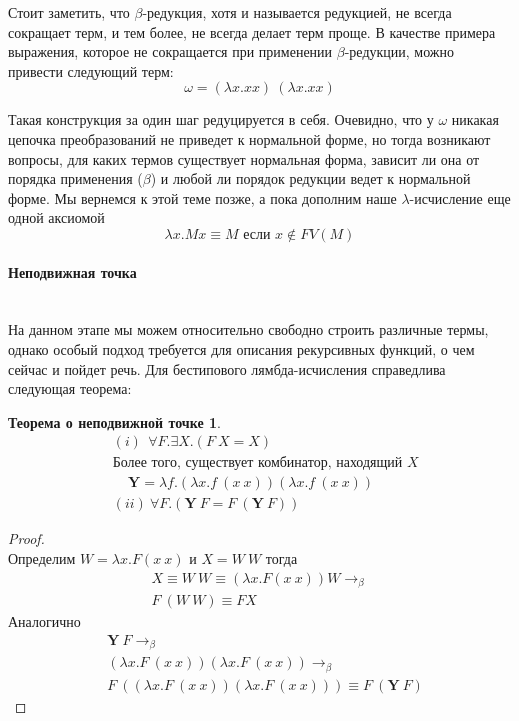 \documentclass[lambda.tex]{subfiles}
\begin{document}
Стоит заметить, что $\beta$-редукция, хотя и называется редукцией, не всегда сокращает терм, и тем более, не всегда делает терм проще. В качестве примера выражения, которое не сокращается при применении $\beta$-редукции, можно привести следующий терм:
\begin{equation*}
	\omega = (\lambda x.xx)\ (\lambda x.xx)
\end{equation*}

Такая конструкция за один шаг редуцируется в себя. Очевидно, что у $\omega$ никакая цепочка преобразований не приведет к нормальной форме, но тогда возникают вопросы, для каких термов существует нормальная форма, зависит ли она от порядка применения ($\beta$) и любой ли порядок редукции ведет к нормальной форме. Мы вернемся к этой теме позже, а пока дополним наше $\lambda$-исчисление еще одной аксиомой
\begin{equation*}
	\lambda x.Mx \equiv M \text{ если }x \not\in FV(M) \tag{$\eta$}
\end{equation*}

\newpage
\paragraph{Неподвижная точка} %
\label{par:fix point}~\\

На данном этапе мы можем относительно свободно строить различные термы, однако особый подход требуется для описания рекурсивных функций, о чем сейчас и пойдет речь. Для бестипового лямбда-исчисления справедлива следующая теорема:
\newtheorem*{fixpoint}{Теорема о неподвижной точке}
\begin{fixpoint}
\begin{align*}
	&(i)\ \ \forall F. \exists X. (F\ X = X) \\
	&\text{Более того, существует комбинатор, находящий $X$}\\
	&\ \ \ \ \ \boldsymbol{Y} = \lambda f.(\lambda x.f\ (x\ x)) (\lambda x.f\ (x\ x))\\
	&(ii)\ \forall F.(\boldsymbol{Y}\ F=F\ (\boldsymbol{Y}\ F))
\end{align*}
\end{fixpoint}

\begin{proof}~\\
Определим $W = \lambda x.F(x\ x)$ и $X = W\ W$ тогда
\begin{align*}
	X \equiv W\ W \equiv (\lambda x.F(x\ x))W \rightarrow_\beta\\
	F\ (W\ W) \equiv F X
\end{align*}
Аналогично
\begin{align*}
	&\boldsymbol{Y}\ F \rightarrow_\beta\\
	&(\lambda x.F\ (x\ x)) (\lambda x.F\ (x\ x)) \rightarrow_\beta\\
	&F\ ((\lambda x.F\ (x\ x)) (\lambda x.F\ (x\ x))) \equiv F\ (\boldsymbol{Y}\ F)
\end{align*}
\end{proof}
\end{document}
